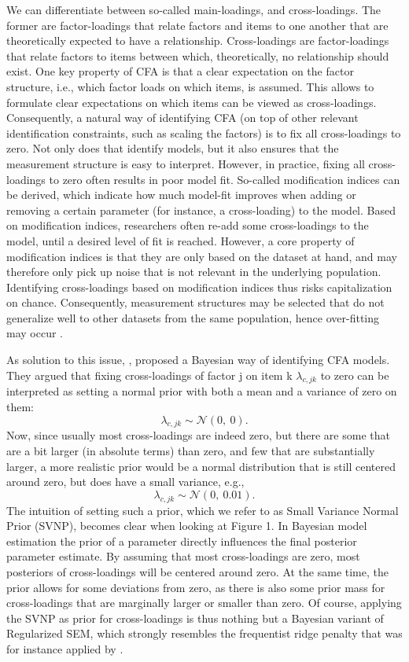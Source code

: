 \documentclass[]{interact}
\theoremstyle{plain}%
\theoremstyle{definition}
\theoremstyle{remark}
\begin{document}
We can differentiate between so-called main-loadings, and
cross-loadings. The former are factor-loadings that relate factors and
items to one another that are theoretically expected to have a
relationship. Cross-loadings are factor-loadings that relate factors to
items between which, theoretically, no relationship should exist. One
key property of CFA is that a clear expectation on the factor structure,
i.e., which factor loads on which items, is assumed. This allows to
formulate clear expectations on which items can be viewed as
cross-loadings. Consequently, a natural way of identifying CFA (on top
of other relevant identification constraints, such as scaling the
factors) is to fix all cross-loadings to zero. Not only does that
identify models, but it also ensures that the measurement structure is
easy to interpret. However, in practice, fixing all cross-loadings to
zero often results in poor model fit. So-called modification indices can
be derived, which indicate how much model-fit improves when adding or
removing a certain parameter (for instance, a cross-loading) to the
model. Based on modification indices, researchers often re-add some
cross-loadings to the model, until a desired level of fit is reached.
However, a core property of modification indices is that they are only
based on the dataset at hand, and may therefore only pick up noise that
is not relevant in the underlying population. Identifying cross-loadings
based on modification indices thus risks capitalization on chance.
Consequently, measurement structures may be selected that do not
generalize well to other datasets from the same population, hence
over-fitting may occur \citep{maccallum_model_1992}.

As solution to this issue, \citet{muthen_bayesian_2012}, proposed a
Bayesian way of identifying CFA models. They argued that fixing
cross-loadings of factor j on item k \(\lambda_{c,jk}\) to zero can be
interpreted as setting a normal prior with both a mean and a variance of
zero on them: \[\lambda_{c,jk}  \sim \mathcal{N}(0, \ 0).\] Now, since
usually most cross-loadings are indeed zero, but there are some that are
a bit larger (in absolute terms) than zero, and few that are
substantially larger, a more realistic prior would be a normal
distribution that is still centered around zero, but does have a small
variance, e.g.,\\
\[\lambda_{c,jk}  \sim \mathcal{N}(0, \ 0.01).\] The intuition of
setting such a prior, which we refer to as Small Variance Normal Prior
(SVNP), becomes clear when looking at Figure 1. In Bayesian model
estimation the prior of a parameter directly influences the final
posterior parameter estimate. By assuming that most cross-loadings are
zero, most posteriors of cross-loadings will be centered around zero. At
the same time, the prior allows for some deviations from zero, as there
is also some prior mass for cross-loadings that are marginally larger or
smaller than zero. Of course, applying the SVNP as prior for
cross-loadings is thus nothing but a Bayesian variant of Regularized
SEM, which strongly resembles the frequentist ridge penalty that was for
instance applied by \citet{jacobucci_regularized_2016}.
\end{document}
